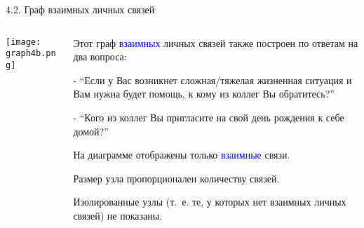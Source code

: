 \begin{frame}{4.2. Граф взаимных личных связей}

\begin{columns}
\begin{column}{0.75\textwidth} 
\centering
          \texttt{[image: graph4b.png]}
\end{column}
\begin{column}{0.25\textwidth} 
\tiny
Этот граф \textcolor{blue}{взаимных} личных связей также построен по ответам на два вопроса:
\smallskip

- ``Если у Вас возникнет сложная/тяжелая жизненная ситуация и Вам нужна будет помощь, к кому из коллег Вы обратитесь?''
\smallskip

- ``Кого из коллег Вы пригласите на свой день рождения к себе домой?''
\smallskip

На диаграмме отображены только \textcolor{blue}{взаимные} связи.
\smallskip

Размер узла пропорционален количеству связей.
\smallskip

Изолированные узлы (т.~е. те, у которых нет взаимных личных связей) не показаны.

\end{column}
\end{columns}
\end{frame}


